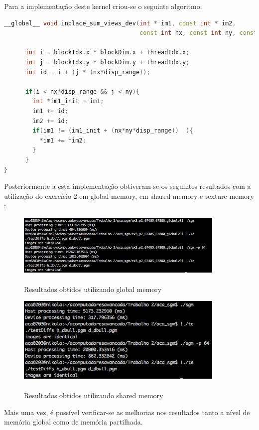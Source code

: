 \documentclass[pdftex,12pt,a4paper]{report}
\begin{document}
Para a implementação deste kernel criou-se o seguinte algoritmo:

  \begin{lstlisting}[language=c++, basicstyle=\scriptsize]
__global__ void inplace_sum_views_dev(int * im1, const int * im2,
                                      const int nx, const int ny, const int disp_range){
    
      int i = blockIdx.x * blockDim.x + threadIdx.x;
      int j = blockIdx.y * blockDim.y + threadIdx.y;
      int id = i + (j * (nx*disp_range));
      
      if(i < nx*disp_range && j < ny){
        int *im1_init = im1;
        im1 += id;
        im2 += id;
        if(im1 != (im1_init + (nx*ny*disp_range))  ){
          *im1 += *im2;
        }
      }
}

\end{lstlisting} 

Posteriormente a esta implementação obtiveram-se os seguintes resultados com a utilização do exercício 2 em global memory, em shared memory  e texture memory :

\begin{figure}[!htb]
\center
 \includegraphics[width=100mm,scale=1]{inplaceglobal.png}
 \caption{\\ Resultados obtidos utilizando global memory}
 \label{fig:inplaceglobal}
\end{figure}

\begin{figure}[!htb]
\center
 \includegraphics[width=100mm,scale=1]{inplaceshared.png}
 \caption{\\ Resultados obtidos utilizando shared memory}
 \label{fig:inplaceshared}
\end{figure}
 
 
Mais uma vez, é possível verificar-se as melhorias nos resultados tanto a nível de memória global como de memória partilhada.
\end{document}
